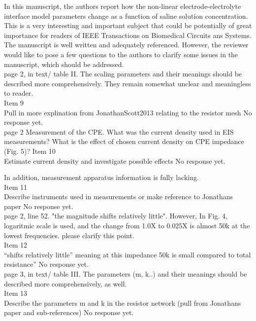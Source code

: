 \documentclass[journal, a4paper]{IEEEtran}
\begin{document}
{\color{blue}
In this manuscript, the authors report how the non-linear electrode-electrolyte interface model parameters change as a function of saline solution concentration. This is a very interesting and important subject that could be potentially of great importance for readers of IEEE Transactions on Biomedical Circuits ans Systems. The manuscript is well written and adequately referenced. However, the reviewer would like to pose a few questions to the authors to clarify some  issues in the manuscript, which should be addressed.\\

page 2, in text/ table II. The scaling parameters and their meanings should be described more comprehensively. They remain somewhat unclear and meaningless to reader.\\
{\color{OliveGreen}
    Item 9\\
    {\color{Red} Pull in more explination from JonathanScott2013 relating to the resistor mesh}
    No response yet.
}\\

page 2 Measurement of the CPE. What was the current density used in EIS measurements?
What is the effect of chosen current density on CPE impedance (Fig. 5)?
{\color{OliveGreen}
    Item 10\\
    {\color{Red} Estimate current density and investigate possible effects}
    No response yet.
}

In addition,  measurement apparatus information is fully lacking.\\
{\color{OliveGreen}
    Item 11\\
    {\color{Red} Describe instruments used in measurements or make reference to Jonathans paper}
    No response yet.
}\\

page 2, line 52. "the magnitude shifts relatively little". However, In Fig. 4, logaritmic scale is used, and the change from 1.0X to 0.025X is almost 50k at the lowest frequencies. 
please clarify this point.\\
{\color{OliveGreen}
    Item 12\\
    {\color{Red} ``shifts relatively little'' meaning at this impedance 50k is small compared to total resistance''}
    No response yet.
}\\

page 3, in text/ table III. The parameters (m, k..) and their meanings should be described more comprehensively, as well.\\
{\color{OliveGreen} 
    Item 13\\
    {\color{Red} Describe the parameters m and k in the resistor network (pull from Jonathans paper and sub-references)}
    No response yet.
}\\

}
\end{document}
